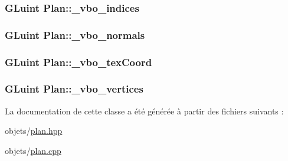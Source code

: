 \hypertarget{class_plan_ad8791ad67d66ac1b24792dc72ec00c64}{
\subsubsection[{\+\_\+vbo\+\_\+indices}]{\setlength{\rightskip}{0pt plus 5cm}G\+Luint Plan\+::\+\_\+vbo\+\_\+indices\hspace{0.3cm}{\ttfamily [private]}}}\label{class_plan_ad8791ad67d66ac1b24792dc72ec00c64}
\hypertarget{class_plan_aa5db33661be2dfcecf68683c33eb22b9}{
\subsubsection[{\+\_\+vbo\+\_\+normals}]{\setlength{\rightskip}{0pt plus 5cm}G\+Luint Plan\+::\+\_\+vbo\+\_\+normals\hspace{0.3cm}{\ttfamily [private]}}}\label{class_plan_aa5db33661be2dfcecf68683c33eb22b9}
\hypertarget{class_plan_a3c16becd29f35260b79af8b9cb6fa892}{
\subsubsection[{\+\_\+vbo\+\_\+tex\+Coord}]{\setlength{\rightskip}{0pt plus 5cm}G\+Luint Plan\+::\+\_\+vbo\+\_\+tex\+Coord\hspace{0.3cm}{\ttfamily [private]}}}\label{class_plan_a3c16becd29f35260b79af8b9cb6fa892}
\hypertarget{class_plan_a7b203dc36964da663836cf7614fe711a}{
\subsubsection[{\+\_\+vbo\+\_\+vertices}]{\setlength{\rightskip}{0pt plus 5cm}G\+Luint Plan\+::\+\_\+vbo\+\_\+vertices\hspace{0.3cm}{\ttfamily [private]}}}\label{class_plan_a7b203dc36964da663836cf7614fe711a}


La documentation de cette classe a été générée à partir des fichiers suivants \+:\begin{DoxyCompactItemize}
\item 
objets/\hyperlink{plan_8hpp}{plan.\+hpp}\item 
objets/\hyperlink{plan_8cpp}{plan.\+cpp}\end{DoxyCompactItemize}
